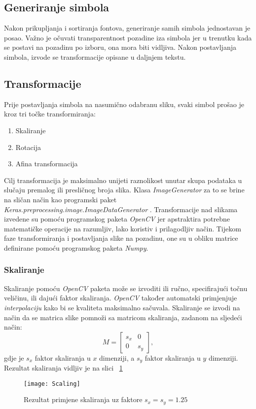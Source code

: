 \subsection{Generiranje simbola}
Nakon prikupljanja i sortiranja fontova, generiranje samih simbola jednostavan je posao.
Važno je očuvati transparentnost pozadine iza simbola jer u trenutku kada se postavi na pozadinu po izboru, ona mora biti vidljiva.
Nakon postavljanja simbola, izvode se transformacije opisane u daljnjem tekstu.
\subsection{Transformacije}
Prije postavljanja simbola na nasumično odabranu sliku, svaki simbol prošao je kroz tri točke transformiranja:
\begin{enumerate}
\item Skaliranje
\item Rotacija
\item Afina transformacija
\end{enumerate}
Cilj transformacija je maksimalno unijeti raznolikost unutar skupa podataka u slučaju premalog ili presličnog broja slika.
Klasa \emph{ImageGenerator} za to se brine na sličan način kao programski paket \emph{Keras.preprocessing.image.ImageDataGenerator} \cite{Keras.io}.
Transformacije nad slikama izvedene su pomoću programskog paketa \emph{OpenCV} \cite{OpenCV} jer apstraktira potrebne matematičke operacije na razumljiv, lako koristiv i prilagodljiv način.
Tijekom faze transformiranja i postavljanja slike na pozadinu, one su u obliku matrice definirane pomoću programskog paketa \emph{Numpy}.
\subsubsection{Skaliranje}
Skaliranje pomoću \emph{OpenCV} paketa može se izvoditi ili ručno, specifirajući točnu veličinu, ili dajući faktor skaliranja.
\emph{OpenCV} također automatski primjenjuje \emph{interpolaciju} kako bi se kvaliteta maksimalno sačuvala.
Skaliranje se izvodi na način da se matrica slike pomnoži sa matricom skaliranja, zadanom na sljedeći način:
$$
M
=
\begin{bmatrix}
	s_{x} & 0 \\
	0 & s_{y}
\end{bmatrix},
$$
gdje je $s_{x}$ faktor skaliranja u $x$ dimenziji, a $s_{y}$ faktor skaliranja u $y$ dimenziji.
Rezultat skaliranja vidljiv je na slici ~\ref{fig:scaling}
\lstset{numbers=left}

\begin{figure}[h!]
	\centering
	\texttt{[image: Scaling]}
	 \caption{Rezultat primjene skaliranja uz faktore $s_{x} = s_{y} = 1.25$}
 	 \label{fig:scaling}
\end{figure}
